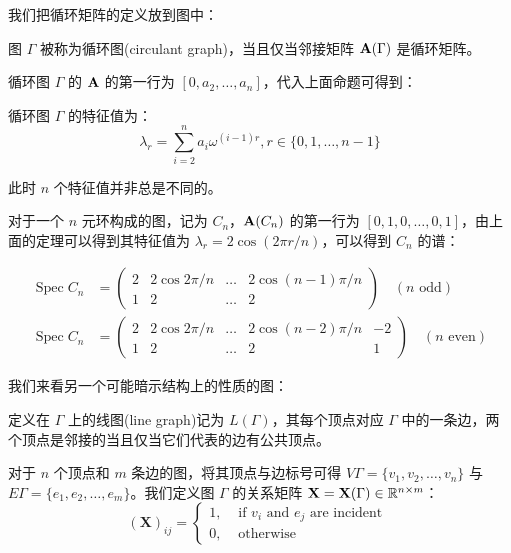 我们把循环矩阵的定义放到图中：

\begin{definition}[循环图]
图 $\Gamma$ 被称为循环图(circulant graph)，当且仅当邻接矩阵 $\textbf A(\Gamma)$ 是循环矩阵。
\end{definition}

循环图 $\Gamma$ 的 $\textbf A$ 的第一行为 $[0, a_2, \dots, a_n]$，代入上面命题可得到：

\begin{theorem}[循环图的特征值]
循环图 $\Gamma$ 的特征值为：
\[
\lambda_r = \sum_{i = 2}^n a_i \omega^{(i - 1)r}, r\in\{0, 1, \dots, n - 1\}
\]
\end{theorem}

此时 $n$ 个特征值并非总是不同的。

对于一个 $n$ 元环构成的图，记为 $C_n$，$\textbf A(C_n)$ 的第一行为 $[0, 1, 0, \dots, 0, 1]$，由上面的定理可以得到其特征值为 $\lambda_r = 2\cos(2\pi r / n)$，可以得到 $C_n$ 的谱：

\[
\begin{aligned}
 \operatorname{Spec} C_{n} & = \left(\begin{array}{cccc}2 & 2 \cos 2 \pi / n & \ldots & 2 \cos (n-1) \pi / n \\ 1 & 2 & \ldots & 2\end{array}\right) \quad(n\text{ odd}) \\
 \operatorname{Spec} C_{n} & = \left(\begin{array}{ccccc}2 & 2 \cos 2 \pi / n & \ldots & 2 \cos (n-2) \pi / n & -2 \\ 1 & 2 & \ldots & 2 & 1\end{array}\right) \quad(n\text{ even}) 
\end{aligned}
\]

我们来看另一个可能暗示结构上的性质的图：

\begin{definition}[线图]
定义在 $\Gamma$ 上的线图(line graph)记为 $L(\Gamma)$，其每个顶点对应 $\Gamma$ 中的一条边，两个顶点是邻接的当且仅当它们代表的边有公共顶点。
\end{definition}

对于 $n$ 个顶点和 $m$ 条边的图，将其顶点与边标号可得 $V\Gamma = \{v_1, v_2, \dots, v_n\}$ 与 $E\Gamma = \{e_1, e_2, \dots, e_m\}$。我们定义图 $\Gamma$ 的关系矩阵 $\textbf X=\textbf X(\Gamma) \in \mathbb R^{n\times m}$：
\[
(\mathbf{X})_{i j}=\left\{\begin{array}{ll}
1, & \text { if } v_{i} \text { and } e_{j} \text { are incident } \\
0, & \text { otherwise }
\end{array}\right.
\]

